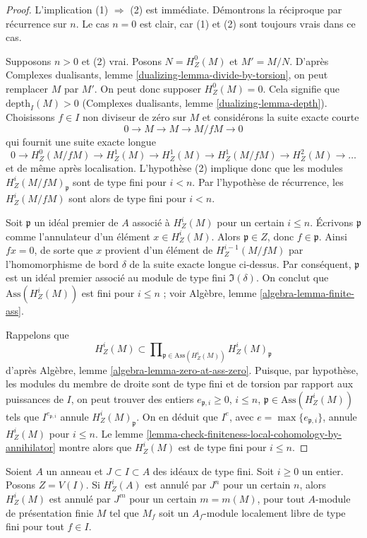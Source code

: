 \begin{proof}
L'implication (1) $\Rightarrow$ (2) est immédiate. Démontrons la réciproque par récurrence sur $n$. Le cas $n = 0$ est clair, car (1) et (2) sont toujours vrais dans ce cas.

\medskip\noindent
Supposons $n > 0$ et (2) vrai. Posons $N = H^0_Z(M)$ et $M' = M/N$. D'après Complexes dualisants, lemme \ref{dualizing-lemma-divide-by-torsion}, on peut remplacer $M$ par $M'$. On peut donc supposer $H^0_Z(M) = 0$. Cela signifie que $\text{depth}_I(M) > 0$ (Complexes dualisants, lemme \ref{dualizing-lemma-depth}). Choisissons $f \in I$ non diviseur de zéro sur $M$ et considérons la suite exacte courte
$$
0 \to M \to M \to M/fM \to 0
$$
qui fournit une suite exacte longue
$$
0 \to H^0_Z(M/fM) \to H^1_Z(M) \to H^1_Z(M) \to H^1_Z(M/fM) \to
H^2_Z(M) \to \ldots
$$
et de même après localisation. L'hypothèse (2) implique donc que les modules $H^i_Z(M/fM)_\mathfrak p$ sont de type fini pour $i < n$. Par l'hypothèse de récurrence, les $H^i_Z(M/fM)$ sont alors de type fini pour $i < n$.

\medskip\noindent
Soit $\mathfrak p$ un idéal premier de $A$ associé à $H^i_Z(M)$ pour un certain $i \leq n$. Écrivons $\mathfrak p$ comme l'annulateur d'un élément $x \in H^i_Z(M)$. Alors $\mathfrak p \in Z$, donc $f \in \mathfrak p$. Ainsi $fx = 0$, de sorte que $x$ provient d'un élément de $H^{i - 1}_Z(M/fM)$ par l'homomorphisme de bord $\delta$ de la suite exacte longue ci-dessus. Par conséquent, $\mathfrak p$ est un idéal premier associé au module de type fini $\Im(\delta)$. On conclut que $\text{Ass}(H^i_Z(M))$ est fini pour $i \leq n$ ; voir Algèbre, lemme \ref{algebra-lemma-finite-ass}.

\medskip\noindent
Rappelons que
$$
H^i_Z(M) \subset
\prod\nolimits_{\mathfrak p \in \text{Ass}(H^i_Z(M))}
H^i_Z(M)_\mathfrak p
$$
d'après Algèbre, lemme \ref{algebra-lemma-zero-at-ass-zero}. Puisque, par hypothèse, les modules du membre de droite sont de type fini et de torsion par rapport aux puissances de $I$, on peut trouver des entiers $e_{\mathfrak p, i} \geq 0$, $i \leq n$, $\mathfrak p \in \text{Ass}(H^i_Z(M))$ tels que $I^{e_{\mathfrak p, i}}$ annule $H^i_Z(M)_\mathfrak p$. On en déduit que $I^e$, avec $e = \max\{e_{\mathfrak p, i}\}$, annule $H^i_Z(M)$ pour $i \leq n$. Le lemme \ref{lemma-check-finiteness-local-cohomology-by-annihilator} montre alors que $H^i_Z(M)$ est de type fini pour $i \leq n$.
\end{proof}

\begin{lemma}
\label{lemma-annihilate-local-cohomology}
Soient $A$ un anneau et $J \subset I \subset A$ des idéaux de type fini. Soit $i \geq 0$ un entier. Posons $Z = V(I)$. Si $H^i_Z(A)$ est annulé par $J^n$ pour un certain $n$, alors $H^i_Z(M)$ est annulé par $J^m$ pour un certain $m = m(M)$, pour tout $A$-module de présentation finie $M$ tel que $M_f$ soit un $A_f$-module localement libre de type fini pour tout $f \in I$.
\end{lemma}

